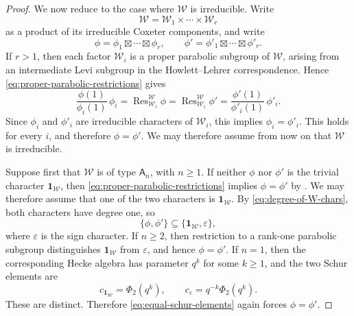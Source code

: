 \documentclass{amsart}
\theoremstyle{plain}
\numberwithin{equation}{section}
\theoremstyle{definition}
\newcommand{\Res}{\operatorname{Res}}
\newcommand{\cW}{\mathcal{W}}
\begin{document}
\begin{proof}
We now reduce to the case where $\cW$ is irreducible.  Write
\[
\cW=\cW_1\times\cdots\times \cW_r
\]
as a product of its irreducible Coxeter components, and write
\[
\phi=\phi_1\boxtimes\cdots\boxtimes \phi_r,
\qquad
\phi'=\phi'_1\boxtimes\cdots\boxtimes \phi'_r.
\]
If $r>1$, then each factor $\cW_i$ is a proper parabolic subgroup of $\cW$,
arising from an intermediate Levi subgroup in the Howlett--Lehrer
correspondence.  Hence \eqref{eq:proper-parabolic-restrictions} gives
\[
\frac{\phi(1)}{\phi_i(1)}\,\phi_i
=
\Res_{\cW_i}^{\cW}\phi
=
\Res_{\cW_i}^{\cW}\phi'
=
\frac{\phi'(1)}{\phi'_i(1)}\,\phi'_i.
\]
Since $\phi_i$ and $\phi'_i$ are irreducible characters of $\cW_i$, this
implies $\phi_i=\phi'_i$.  This holds for every $i$, and therefore
$\phi=\phi'$.  We may therefore assume from now on that $\cW$ is irreducible.

Suppose first that $\cW$ is of type $\mathsf A_n$, with $n\geq 1$.  If neither
$\phi$ nor $\phi'$ is the trivial character $\mathbf 1_{\cW}$, then
\eqref{eq:proper-parabolic-restrictions} implies $\phi=\phi'$ by
\cite[Cor.~5.4.8]{geck-pfeiffer:2000:characters-of-finite-coxeter-groups}.
We may therefore assume that one of the two characters is $\mathbf 1_{\cW}$.
By \eqref{eq:degree-of-W-chars}, both characters have degree one, so
\[
\{\phi,\phi'\}\subseteq \{\mathbf 1_{\cW},\varepsilon\},
\]
where $\varepsilon$ is the sign character.  If $n\geq 2$, then restriction to
a rank-one parabolic subgroup distinguishes $\mathbf 1_{\cW}$ from
$\varepsilon$, and hence $\phi=\phi'$.  If $n=1$, then the corresponding
Hecke algebra has parameter $q^k$ for some $k\geq 1$, and the two Schur
elements are
\[
c_{\mathbf 1_{\cW}}=\Phi_2(q^k),
\qquad
c_{\varepsilon}=q^{-k}\Phi_2(q^k).
\]
These are distinct.  Therefore \eqref{eq:equal-schur-elements} again forces
$\phi=\phi'$.


\end{proof}
\end{document}
